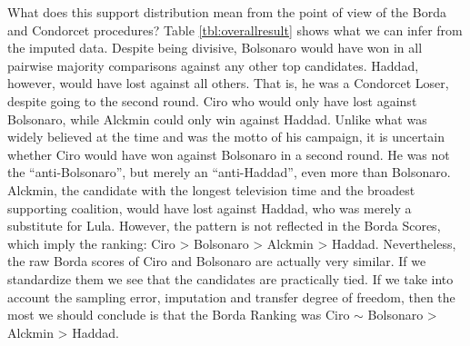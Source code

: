 \documentclass[hidelinks,11pt]{article}
\begin{document}
What does this support distribution mean from the point of view of the Borda and
Condorcet procedures? Table \ref{tbl:overallresult} shows what we can infer from
the imputed data. Despite being divisive, Bolsonaro would have won in all
pairwise majority comparisons against any other top candidates. Haddad, however,
would have lost against all others. That is, he was a Condorcet Loser, despite
going to the second round. Ciro who would only have lost against Bolsonaro,
while Alckmin could only win against Haddad. Unlike what was widely believed at
the time and was the motto of his campaign, it is uncertain whether Ciro would
have won against Bolsonaro in a second round. He was not the ``anti-Bolsonaro'',
but merely an ``anti-Haddad'', even more than Bolsonaro. Alckmin, the candidate
with the longest television time and the broadest supporting coalition, would
have lost against Haddad, who was merely a substitute for Lula. However, the
pattern is not reflected in the Borda Scores, which imply the ranking: Ciro >
Bolsonaro > Alckmin > Haddad. Nevertheless, the raw Borda scores of Ciro and
Bolsonaro are actually very similar. If we standardize them we see that the
candidates are practically tied. If we take into account the sampling error,
imputation and transfer degree of freedom, then the most we should conclude is
that the Borda Ranking was Ciro \(\sim\) Bolsonaro > Alckmin > Haddad.
\end{document}
